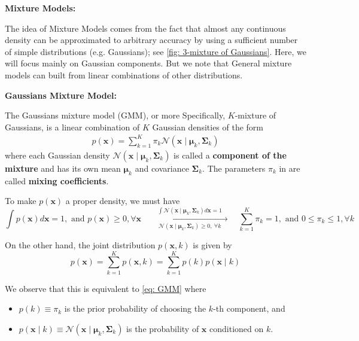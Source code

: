 \documentclass[11pt]{article}
\theoremstyle{plain} %
\newenvironment{topic}
{\color{C2}\normalfont\begin{framed}\begingroup }
  {\endgroup\end{framed}}
\theoremstyle{remark}
\begin{document}
\begin{topic}
  \textbf{Mixture Models:}

  The idea of Mixture Models comes from the fact that almost any continuous
  density can be approximated to arbitrary accuracy by using a sufficient number
  of simple distributions (e.g. Gaussians); see \cref{fig: 3-mixture of Gaussians}. Here, we will focus
  mainly on Gaussian components. But we note that General mixture models can built
  from linear combinations of other distributions.

  \textbf{Gaussians Mixture Model:}

  The Gaussians mixture model (GMM), or more Specifically, $K$-mixture of Gaussians, is a linear combination
  of $K$ Gaussian densities of the form
  \begin{align}
    p(\mathbf{x})=\sum_{k=1}^{K} \pi_{k} \mathcal{N}\left(\mathbf{x} \mid \boldsymbol{\mu}_{k}, \boldsymbol{\Sigma}_{k}\right)
    \label{eq: GMM}
  \end{align}
  where each Gaussian density $\mathcal{N}\left(\mathbf{x} \mid
    \boldsymbol{\mu}_{k}, \boldsymbol{\Sigma}_{k}\right)$ is called a \textbf{component of
    the mixture} and has its own mean $\boldsymbol{\mu}_{k}$ and covariance
  $\boldsymbol{\Sigma}_{k}$. The parameters $\pi_{k}$ in are called \textbf{mixing
    coefficients}.

  To make $p(\mathbf{x})$ a proper density, we must have
  $$
    \int p(\mathbf{x}) d \mathbf{x} =1, \text { and } p(\mathbf{x}) \geqslant 0, \forall \mathbf{x}
    \quad
    \xrightarrow[\quad\mathcal{N}\left(\mathbf{x}
      \mid \boldsymbol{\mu}_{k}, \boldsymbol{\Sigma}_{k}\right) \geqslant 0, ~\forall k\quad]
    {\quad\int \mathcal{N}\left(\mathbf{x} \mid \boldsymbol{\mu}_{k},
      \boldsymbol{\Sigma}_{k}\right) d \mathbf{x}=1\quad}
    \quad
    \sum_{k=1}^{K} \pi_{k}=1, \text { and } 0 \leqslant \pi_{k} \leqslant 1, \forall k
  $$

  On the other hand, the joint distribution $p(\mathbf{x}, k)$ is given by
  $$
    p(\mathbf{x})=\sum_{k=1}^{K} p(\mathbf{x}, k)=\sum_{k=1}^{K} p(k) p(\mathbf{x} \mid k)
  $$

  We observe that this is equivalent to \cref{eq: GMM} where
  \begin{itemize}
    \item $p(k) \equiv \pi_{k}$ is the prior probability of choosing the $k$-th
          component, and

    \item $p(\mathbf{x} \mid k) \equiv \mathcal{N}\left(\mathbf{x} \mid
            \boldsymbol{\mu}_{k}, \boldsymbol{\Sigma}_{k}\right)$ is the probability of
          $\mathbf{x}$ conditioned on $k$.


\end{itemize}
\end{topic}
\end{document}
